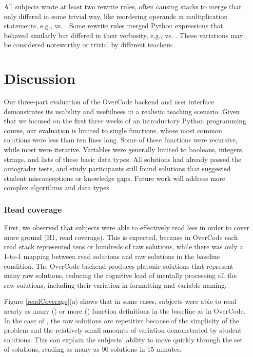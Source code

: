 All subjects wrote at least two rewrite rules, often causing stacks to merge that only differed in some trivial way, like reordering operands in multiplication statements, e.g.,  vs. . Some rewrite rules merged Python expressions that behaved similarly but differed in their verbosity, e.g.,  vs. . These variations may be considered noteworthy or trivial by different teachers.

\section{Discussion}

Our three-part evaluation of the OverCode backend and user interface demonstrates its usability and usefulness in a realistic teaching scenario. Given that we focused on the first three weeks of an introductory Python programming course, our evaluation is limited to single functions, whose most common solutions were less than ten lines long. Some of these functions were recursive, while most were iterative. Variables were generally limited to booleans, integers, strings, and lists of these basic data types. All solutions had already passed the autograder tests, and study participants still found solutions that suggested student misconceptions or knowledge gaps. Future work will address more complex algorithms and data types.

\subsubsection{Read coverage}
First, we observed that subjects were able to effectively read less in order to cover more ground (H1, read coverage). This is expected, because in OverCode each read stack represented tens or hundreds of raw solutions, while there was only a 1-to-1 mapping between read solutions and raw solutions in the baseline condition. The OverCode backend produces platonic solutions that represent many raw solutions, reducing the cognitive load of mentally processing all the raw solutions, including their variation in formatting and variable naming.

Figure \ref{readCoverage}(a) shows that in some cases, subjects were able to read nearly as many () or more () function definitions in the baseline as in OverCode. In the case of , the raw solutions are repetitive because of the simplicity of the problem and the relatively small amounts of variation demonstrated by student solutions. This can explain the subjects' ability to move quickly through the set of solutions, reading as many as 90 solutions in 15 minutes.

